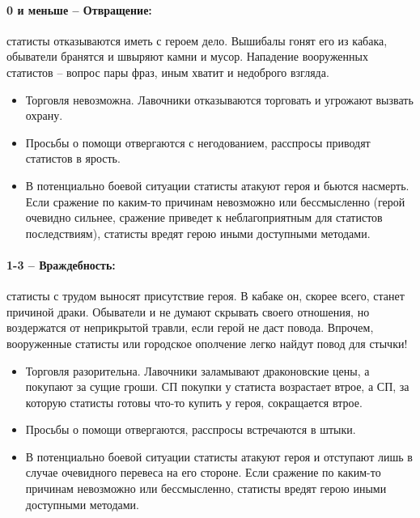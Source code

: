 \paragraph{0 и меньше – Отвращение:} статисты отказываются иметь с героем дело. Вышибалы гонят его из кабака, обыватели бранятся и швыряют камни и мусор. Нападение вооруженных статистов – вопрос пары фраз, иным хватит и недоброго взгляда.
\begin{itemize}
  \item Торговля невозможна. Лавочники отказываются торговать и угрожают вызвать охрану.
  \item Просьбы о помощи отвергаются с негодованием, расспросы приводят статистов в ярость.
  \item В потенциально боевой ситуации статисты атакуют героя и бьются насмерть. Если сражение по каким-то причинам невозможно или бессмысленно (герой очевидно сильнее, сражение приведет к неблагоприятным для статистов последствиям), статисты вредят герою иными доступными методами. 
\end{itemize}
\paragraph{1-3 – Враждебность:} статисты с трудом выносят присутствие героя. В кабаке он, скорее всего, станет причиной драки. Обыватели и не думают скрывать своего отношения, но воздержатся от неприкрытой травли, если герой не даст повода. Впрочем, вооруженные статисты или городское ополчение легко найдут повод для стычки!
\begin{itemize}
  \item Торговля разорительна. Лавочники заламывают драконовские цены, а покупают за сущие гроши. СП покупки у статиста возрастает втрое, а СП, за которую статисты готовы что-то купить у героя, сокращается втрое.
  \item Просьбы о помощи отвергаются, расспросы встречаются в штыки.
  \item В потенциально боевой ситуации статисты атакуют героя и отступают лишь в случае очевидного перевеса на его стороне. Если сражение по каким-то причинам невозможно или бессмысленно, статисты вредят герою иными доступными методами.
\end{itemize}
